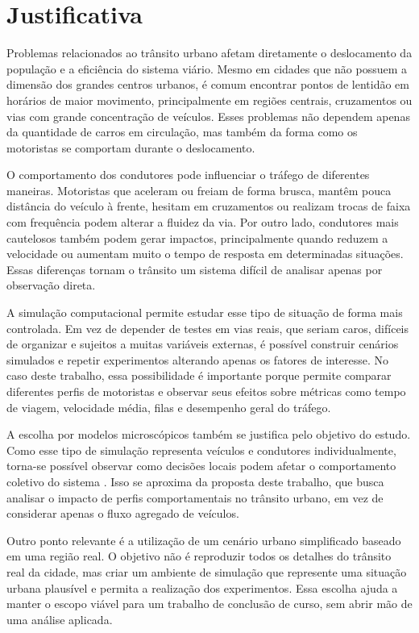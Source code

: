 \section{Justificativa}

Problemas relacionados ao trânsito urbano afetam diretamente o deslocamento da população e a eficiência do sistema viário. Mesmo em cidades que não possuem a dimensão dos grandes centros urbanos, é comum encontrar pontos de lentidão em horários de maior movimento, principalmente em regiões centrais, cruzamentos ou vias com grande concentração de veículos. Esses problemas não dependem apenas da quantidade de carros em circulação, mas também da forma como os motoristas se comportam durante o deslocamento.

O comportamento dos condutores pode influenciar o tráfego de diferentes maneiras. Motoristas que aceleram ou freiam de forma brusca, mantêm pouca distância do veículo à frente, hesitam em cruzamentos ou realizam trocas de faixa com frequência podem alterar a fluidez da via. Por outro lado, condutores mais cautelosos também podem gerar impactos, principalmente quando reduzem a velocidade ou aumentam muito o tempo de resposta em determinadas situações. Essas diferenças tornam o trânsito um sistema difícil de analisar apenas por observação direta.

A simulação computacional permite estudar esse tipo de situação de forma mais controlada. Em vez de depender de testes em vias reais, que seriam caros, difíceis de organizar e sujeitos a muitas variáveis externas, é possível construir cenários simulados e repetir experimentos alterando apenas os fatores de interesse. No caso deste trabalho, essa possibilidade é importante porque permite comparar diferentes perfis de motoristas e observar seus efeitos sobre métricas como tempo de viagem, velocidade média, filas e desempenho geral do tráfego.

A escolha por modelos microscópicos também se justifica pelo objetivo do estudo. Como esse tipo de simulação representa veículos e condutores individualmente, torna-se possível observar como decisões locais podem afetar o comportamento coletivo do sistema \cite{brambila_2008}. Isso se aproxima da proposta deste trabalho, que busca analisar o impacto de perfis comportamentais no trânsito urbano, em vez de considerar apenas o fluxo agregado de veículos.

Outro ponto relevante é a utilização de um cenário urbano simplificado baseado em uma região real. O objetivo não é reproduzir todos os detalhes do trânsito real da cidade, mas criar um ambiente de simulação que represente uma situação urbana plausível e permita a realização dos experimentos. Essa escolha ajuda a manter o escopo viável para um trabalho de conclusão de curso, sem abrir mão de uma análise aplicada.

